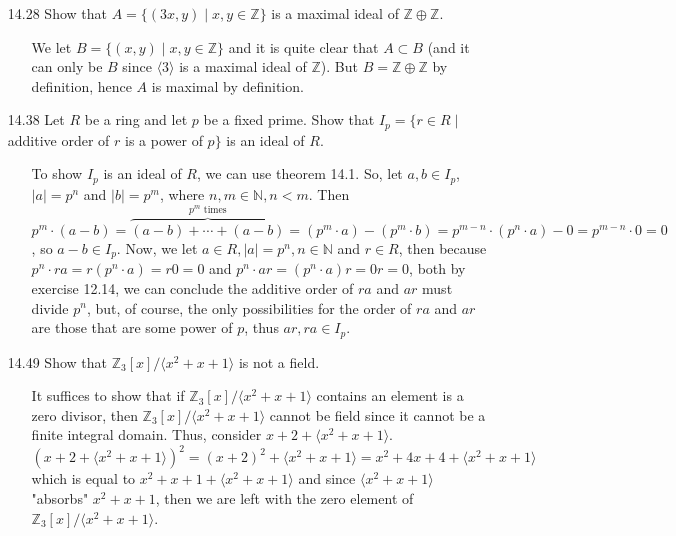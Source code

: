 \documentclass[12pt]{article}
\begin{document}
\begin{enumerate}
\item[14.28] Show that $A = \{ (3x, y) \mid x, y \in \mathbb{Z} \}$ is a maximal ideal of 
$\mathbb{Z} \oplus \mathbb{Z}$.
\begin{enumerate}
\item[] We let $B = \{ (x, y) \mid x, y \in \mathbb{Z} \}$ and it is quite clear that $A \subset B$ (and it
can only be $B$ since $\langle 3\rangle$ is a maximal ideal of $\mathbb{Z}$). But
$B = \mathbb{Z} \oplus \mathbb{Z}$ by definition, hence $A$ is maximal by definition.
\end{enumerate}

\item[14.38] Let $R$ be a ring and let $p$ be a fixed prime. Show that $I_p = \{ r \in R \mid
$ additive order of $r$ is a power of $p \}$ is an ideal of $R$.
\begin{enumerate}
\item[] To show $I_p$ is an ideal of $R$, we can use theorem 14.1. So, let $a, b \in I_p$, $|a| = p^n$ and
$|b| = p^m$, where $n, m \in \mathbb{N}, n < m$. Then 
$p^{m} \cdot (a - b) = \overbrace{(a - b) + \cdots + (a - b)}^{\mbox{$p^{m}$ times}} = 
(p^{m} \cdot a) - (p^{m} \cdot b) = p^{m - n} \cdot (p^n \cdot a) - 0 = p^{m - n} \cdot 0 = 0$, so 
$a - b \in I_p$. Now, we let $a \in R, |a| = p^n, n \in \mathbb{N}$ and $r \in R$, then because 
$p^n \cdot ra = r(p^n \cdot a) = r0 = 0$ and $p^n \cdot ar = (p^n \cdot a)r = 0r = 0$, both by exercise 12.14, 
we can conclude the additive order of $ra$ and $ar$ must divide
$p^n$, but, of course, the only possibilities for the order of $ra$ and $ar$ are those that are some power
of $p$, thus $ar, ra \in I_p$.
\end{enumerate}


\item[14.49] Show that $\mathbb{Z}_3[x]/\langle x^2 + x + 1\rangle$ is not a field.
\begin{enumerate}
\item[] It suffices to show that if $\mathbb{Z}_3[x]/\langle x^2 + x + 1\rangle$ contains an element is a zero divisor, 
then $\mathbb{Z}_3[x]/\langle x^2 + x + 1\rangle$ cannot be field since it cannot be a finite integral domain. 
Thus, consider $x + 2 + \langle x^2 + x + 1\rangle$. $(x + 2 + \langle x^2 + x + 1\rangle)^2 = 
(x + 2)^2 +  \langle x^2 + x + 1\rangle = x^2 + 4x + 4 + \langle x^2 + x + 1\rangle$ which is
equal to $x^2 + x + 1 + \langle x^2 + x + 1\rangle$ and since $\langle x^2 + x + 1\rangle$ "absorbs" 
$x^2 + x + 1$, then we are left with the zero element of $\mathbb{Z}_3[x]/\langle x^2 + x + 1\rangle$.
\end{enumerate}


\end{enumerate}
\end{document}
